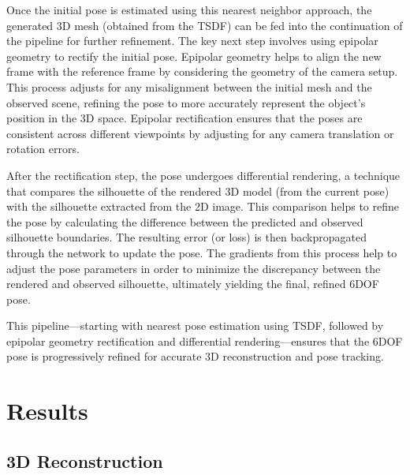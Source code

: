 \documentclass[conference]{IEEEtran}
\begin{document}
Once the initial pose is estimated using this nearest neighbor approach, the generated 3D mesh (obtained from the TSDF) can be fed into the continuation of the pipeline for further refinement. The key next step involves using epipolar geometry to rectify the initial pose. Epipolar geometry helps to align the new frame with the reference frame by considering the geometry of the camera setup. This process adjusts for any misalignment between the initial mesh and the observed scene, refining the pose to more accurately represent the object’s position in the 3D space. Epipolar rectification ensures that the poses are consistent across different viewpoints by adjusting for any camera translation or rotation errors.

After the rectification step, the pose undergoes differential rendering, a technique that compares the silhouette of the rendered 3D model (from the current pose) with the silhouette extracted from the 2D image. This comparison helps to refine the pose by calculating the difference between the predicted and observed silhouette boundaries. The resulting error (or loss) is then backpropagated through the network to update the pose. The gradients from this process help to adjust the pose parameters in order to minimize the discrepancy between the rendered and observed silhouette, ultimately yielding the final, refined 6DOF pose.

This pipeline—starting with nearest pose estimation using TSDF, followed by epipolar geometry rectification and differential rendering—ensures that the 6DOF pose is progressively refined for accurate 3D reconstruction and pose tracking. 




\section{Results}

\subsection{3D Reconstruction}
\end{document}
